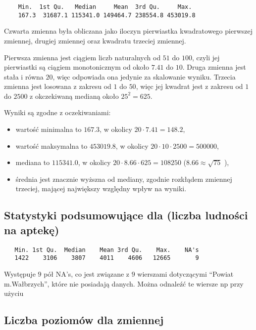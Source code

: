 \begin{verbatim} 
    Min.  1st Qu.   Median     Mean  3rd Qu.     Max. 
    167.3  31687.1 115341.0 149464.7 238554.8 453019.8 
\end{verbatim}

Czwarta zmienna była obliczana jako iloczyn pierwiastka
kwadratowego pierwszej zmiennej, drugiej zmiennej oraz kwadratu trzeciej zmiennej.

Pierwsza zmienna jest ciągiem liczb naturalnych od $51$ do $100$, czyli jej pierwiastki są
ciągiem monotonicznym od około $7.41$ do $10$.
Druga zmienna jest stała i równa $20$, więc odpowiada ona jedynie za skalowanie wyniku.
Trzecia zmienna jest losowana z zakresu od $1$ do $50$, więc jej kwadrat jest z zakresu od $1$ do $2500$
z okczekiwaną medianą około $25^2 = 625$.

Wyniki są zgodne z oczekiwaniami:
\begin{itemize}
    \item wartość minimalna to $167.3$, w okolicy $20\cdot7.41 = 148.2$,
    \item wartość maksymalna to $453019.8$, w okolicy $20\cdot10\cdot2500 = 500000$,
    \item mediana to $115341.0$, w okolicy $20\cdot8.66\cdot625 = 108250$ ($8.66 \approx \sqrt{75}$ ),
    \item średnia jest znacznie wyższna od mediany, zgodnie rozkłądem zmiennej trzeciej,
    mającej największy względny wpływ na wyniki.
\end{itemize}


\subsection*{Statystyki podsumowujące dla  (liczba ludności na aptekę)}

\begin{verbatim}
   Min. 1st Qu.  Median    Mean 3rd Qu.    Max.    NA's 
   1422    3106    3807    4011    4606   12665       9 
\end{verbatim}

Występuje $9$ pół NA's, co jest związane z $9$ wierszami dotyczącymi ``Powiat m.Wałbrzych'', które
nie posiadają danych.
Można odnaleźć te wiersze np przy użyciu 


\subsection*{Liczba poziomów dla zmiennej }

